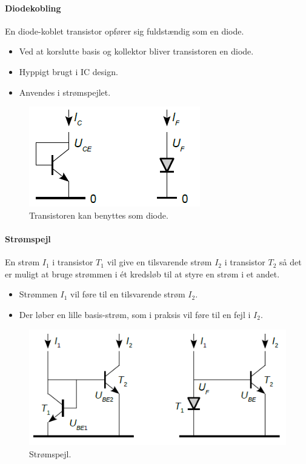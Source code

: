 \documentclass[danish]{article}
\begin{document}
\paragraph{Diodekobling} En diode-koblet transistor opfører sig fuldstændig som en diode.
\begin{itemize}
	\item Ved at korslutte basis og kollektor bliver transistoren en diode.
	\item Hyppigt brugt i IC design.
	\item Anvendes i strømspejlet.
\end{itemize}

\begin{figure} [H]
	\centering
	\includegraphics[width=0.5\linewidth]{graphics/diodekobling}
	\caption{Transistoren kan benyttes som diode.}
	\label{fig:diodekobling}
\end{figure}

\paragraph{Strømspejl}
En strøm $I_1$ i transistor $T_1$ vil give en tilsvarende strøm $I_2$ i transistor $T_2$ så det er muligt at bruge strømmen i ét kredsløb til at styre en strøm i et andet.
\begin{itemize}
	\item Strømmen $I_1$ vil føre til en tilsvarende strøm $I_2$.
	\item Der løber en lille basis-strøm, som i praksis vil føre til en fejl i $I_2$.
\end{itemize}

\begin{figure} [H]
	\centering
	\includegraphics[width=0.8\linewidth]{graphics/diodekobling1}
	\caption{Strømspejl.}
	\label{fig:currentmirror}
\end{figure}
\end{document}
